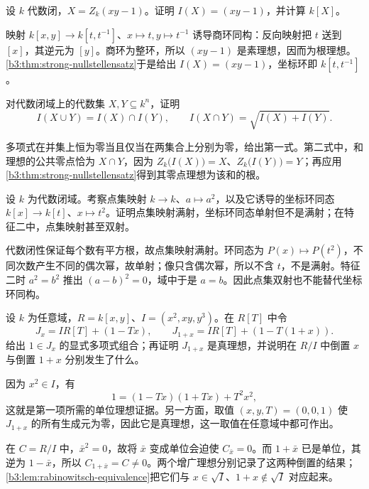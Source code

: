 \begin{exercise}\label{b3:ex:06-hyperbola-vanishing}
	设 \(k\) 代数闭，\(X=Z_k(xy-1)\)。证明 \(I(X)=(xy-1)\)，并计算 \(k[X]\)。
\end{exercise}
\begin{solution}
	映射 \(k[x,y]\to k[t,t^{-1}]\)、\(x\mapsto t,y\mapsto t^{-1}\) 诱导商环同构：反向映射把 \(t\) 送到 \([x]\)，其逆元为 \([y]\)。商环为整环，所以 \((xy-1)\) 是素理想，因而为根理想。\cref{b3:thm:strong-nullstellensatz}于是给出 \(I(X)=(xy-1)\)，坐标环即 \(k[t,t^{-1}]\)。
\end{solution}

\begin{exercise}\label{b3:ex:06-unions-intersections}
	对代数闭域上的代数集 \(X,Y\subseteq k^n\)，证明
	\[
		I(X\cup Y)=I(X)\cap I(Y),\qquad I(X\cap Y)=\sqrt{I(X)+I(Y)}.
	\]
\end{exercise}
\begin{solution}
	多项式在并集上恒为零当且仅当在两集合上分别为零，给出第一式。第二式中，和理想的公共零点恰为 \(X\cap Y\)，因为 \(Z_k\bigl(I(X)\bigr)=X\)、\(Z_k\bigl(I(Y)\bigr)=Y\)；再应用\cref{b3:thm:strong-nullstellensatz}得到其零点理想为该和的根。
\end{solution}

\begin{exercise}\label{b3:ex:06-squaring-pullback}
	设 \(k\) 为代数闭域。考察点集映射 \(k\to k\)、\(a\mapsto a^2\)，以及它诱导的坐标环同态 \(k[x]\to k[t]\)、\(x\mapsto t^2\)。证明点集映射满射，坐标环同态单射但不是满射；在特征二中，点集映射甚至双射。
\end{exercise}
\begin{solution}
	代数闭性保证每个数有平方根，故点集映射满射。环同态为 \(P(x)\mapsto P(t^2)\)，不同次数产生不同的偶次幂，故单射；像只含偶次幂，所以不含 \(t\)，不是满射。特征二时 \(a^2=b^2\) 推出 \((a-b)^2=0\)，域中于是 \(a=b\)。因此点集双射也不能替代坐标环同构。
\end{solution}

\begin{exercise}\label{b3:ex:06-rabinowitsch-equivalence}
	设 \(k\) 为任意域，\(R=k[x,y]\)、\(I=(x^2,xy,y^3)\)。在 \(R[T]\) 中令
	\[
		J_x=IR[T]+(1-Tx),\qquad J_{1+x}=IR[T]+(1-T(1+x)).
	\]
	给出 \(1\in J_x\) 的显式多项式组合；再证明 \(J_{1+x}\) 是真理想，并说明在 \(R/I\) 中倒置 \(x\) 与倒置 \(1+x\) 分别发生了什么。
\end{exercise}
\begin{solution}
	因为 \(x^2\in I\)，有
	\[
		1=(1-Tx)(1+Tx)+T^2x^2,
	\]
	这就是第一项所需的单位理想证据。另一方面，取值 \((x,y,T)=(0,0,1)\) 使 \(J_{1+x}\) 的所有生成元为零，因此它是真理想，这一取值在任意域中都可作出。

	在 \(C=R/I\) 中，\(\bar x^2=0\)，故将 \(\bar x\) 变成单位会迫使 \(C_{\bar x}=0\)。而 \(1+\bar x\) 已是单位，其逆为 \(1-\bar x\)，所以 \(C_{1+\bar x}=C\ne0\)。两个增广理想分别记录了这两种倒置的结果；\cref{b3:lem:rabinowitsch-equivalence}把它们与 \(x\in\sqrt I\)、\(1+x\notin\sqrt I\) 对应起来。
\end{solution}

